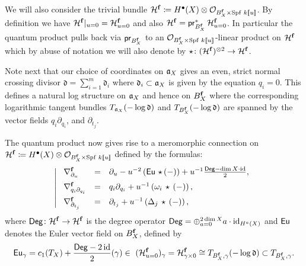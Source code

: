 \documentclass[twoside,leqno]{article}
\numberwithin{equation}{section}
\theoremstyle{plain}
\theoremstyle{definition}
\begin{document}
We will also consider the trivial  bundle $\mathcal H^{\mathbf{f}} \coloneqq H^{\bullet}(X)\otimes \mathcal O_{B_{X}^{\mathbf{f}}\times \operatorname{Spf} \, k[\![u]\!]}$. By definition we have $\mathcal H^{\mathbf{f}}|_{u = 0} = \mathcal H^{\mathbf{f}}_{u=0}$
and also $\mathcal H^{\mathbf{f}} = \mathsf{pr}_{B_{X}^{\mathbf{f}}}^{*} \, \mathcal H^{\mathbf{f}}_{u=0}$. In particular the quantum product pulls back via $\mathsf{pr}_{B_{X}^{\mathbf{f}}}$ to an $\mathcal O_{B_{X}^{\mathbf{f}}\times \operatorname{Spf} \, k[\![u]\!]}$-linear product on $\mathcal H^{\mathbf{f}}$ which by abuse of notation we will also denote by $\star \colon (\mathcal H^{\mathbf{f}})^{\otimes 2} \to \mathcal H^{\mathbf{f}}$.


Note next that our choice of coordinates on 
${\mathfrak{a}}_{X}$ gives an even, strict normal crossing divisor 
$\mathfrak{d} = \sum_{i =1}^{m} \mathfrak{d}_{i}$ where $\mathfrak{d}_{i} \subset {\mathfrak{a}}_{X}$ is given by the equation $q_{i} = 0$. This defines a natural log structure on ${\mathfrak{a}}_{X}$ and hence on $B_{X}^{\mathbf{f}}$ where the corresponding logarithmic tangent bundles $T_{{\mathfrak{a}}_{X}}(-\log \mathfrak{d})$ and $T_{B_{X}^{\mathbf{f}}}(-\log \mathfrak{d})$ are spanned by the vector fields $q_{i}\partial_{q_{i}}$, and $\partial_{t_{j}}$.

\medskip


The quantum product now gives rise to a meromorphic connection on
$\mathcal H^{\mathbf{f}} \coloneqq H^{\bullet}(X)\otimes \mathcal O_{B_{X}^{\mathbf{f}}\times \operatorname{Spf} \, k[\![u]\!]}$ defined by
the formulas:
\begin{equation} \label{eq:formalbignabla}
\left| \
\begin{array}{lcl}
\nabla^{\mathbf{f}}_{\partial_{u}} & = & \partial_{u} - u^{-2} \left(\operatorname{\mathsf{Eu}} \, \star\, (-)\right) + u^{-1} \frac{\mathsf{Deg} - \dim X\cdot \operatorname{id}}{2}, \\[+0.5pc]
\nabla^{\mathbf{f}}_{q_{i}\partial_{q_{i}}} & = & q_{i}\partial_{q_{i}} + u^{-1} \left( \omega_{i} \, \star \, (-)\right), \\[+0.5pc]
\nabla^{\mathbf{f}}_{\partial_{t_{j}}} & = & \partial_{t_{j}} + u^{-1} \left( \Delta_{j} \, \star \, (-)\right),
\end{array}
\right.
\end{equation}
where $\mathsf{Deg} \colon \mathcal H^{\mathbf{f}} \to \mathcal H^{\mathbf{f}}$ is the degree operator $\mathsf{Deg} = \oplus_{a = 0}^{2\dim X} a\cdot \operatorname{id}_{H^{a}(X)}$ and $\operatorname{\mathsf{Eu}}$ denotes the Euler vector field on $B_{X}^{\mathbf{f}}$, defined by 
\begin{equation} \label{eq:Eulog}
\operatorname{\mathsf{Eu}}_{\gamma} = c_{1}(T_{X}) + \frac{\mathsf{Deg} - 2\operatorname{id}}{2}(\gamma)
\in \ (\mathcal H^{\mathbf{f}}_{u=0})_{\gamma} = \mathcal H^{\mathbf{f}}_{\gamma\times 0} \cong T_{B_{X}^{\mathbf{f}},\gamma}(-\log \mathfrak{d}) \subset T_{B_{X}^{\mathbf{f}},\gamma}.
\end{equation}
\end{document}

